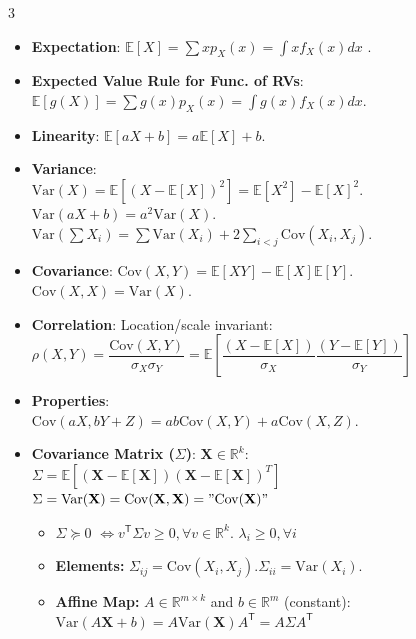 \documentclass[8pt,a4paper]{extarticle}
\newcommand{\subhdr}[1]{{\bfseries\color{teal!90!black} #1}}
\newcommand{\T}{\mathsf{T}}
\newcommand{\E}{\mathbb{E}}
\newcommand{\Var}{\mathrm{Var}}
\newcommand{\Cov}{\mathrm{Cov}}
\newcommand{\R}{\mathbb{R}}
\newcommand{\1}{\mathds{1}}
\newcommand{\sqbr}[1]{\left[ #1 \right]}
\begin{document}
\begin{multicols*}{3}
{\begin{tikzpicture}[>=stealth, thick, scale=0.9]
        \end{tikzpicture}
        }
        

        \begin{itemize}
            \item \subhdr{Expectation}: $\E[X] = \sum x p_X(x) = \int x f_X(x) dx$ .
            \item \subhdr{Expected Value Rule for Func. of RVs}: \\ $\E[g(X)] = \sum g(x) p_X(x) = \int g(x) f_X(x) dx$.
            \item \subhdr{Linearity}: $\E[aX+b] = a\E[X] + b$.
            \item \subhdr{Variance}: \\ $\Var(X) = \E[(X-\E[X])^2] = \E[X^2] - \E[X]^2$. \\ $\Var(aX+b) = a^2\Var(X)$. \\ $ \Var(\sum X_i) = \sum \Var(X_i) + 2\sum_{i<j}\Cov(X_i,X_j)$.
            \item \subhdr{Covariance}: $\Cov(X,Y) = \E[XY] - \E[X]\E[Y]$.\\ $\Cov(X,X) = \Var(X)$.
            \item \subhdr{Correlation}: Location/scale invariant: \\  $\rho(X,Y) = \dfrac{\Cov(X,Y)}{\sigma_X \sigma_Y} = \E[\dfrac{(X-\E[X])}{\sigma_X}\dfrac{(Y-\E[Y])}{\sigma_Y}]$
            \item \subhdr{Properties}: \\ $\Cov(aX,bY+Z) = ab\Cov(X,Y) + a\Cov(X,Z)$. 
            \item \subhdr{Covariance Matrix ($\Sigma$)}: $\mathbf{X} \in \R^k$: \\
            $\Sigma = \E\sqbr{(\mathbf{X}-\E[\mathbf{X}])(\mathbf{X}-\E[\mathbf{X}])^{T}}$ \\
            $\Sigma = \Var(\mathbf{X}) = \Cov(\mathbf{X}, \mathbf{X}) = "\Cov(\mathbf{X})"$
            \begin{itemize}
                \item \subhdr{$\Sigma \succeq 0$} $\iff v^\T \Sigma v \geq 0, \forall v \in \R^k$. $\lambda_i \geq 0, \forall i$
                \item \subhdr{Elements:} $\Sigma_{ij} = \Cov(X_i, X_j) $.\quad $\Sigma_{ii} = \Var(X_i)$.
                \item \subhdr{Affine Map:} $A \in \R^{m \times k}$ and $b \in \R^m$ (constant): \\
                            $\Var(A\mathbf{X} + b) = A\Var(\mathbf{X})A^\T = A\Sigma A^\T$
            \end{itemize}
        \end{itemize}


\end{multicols*}
\end{document}
